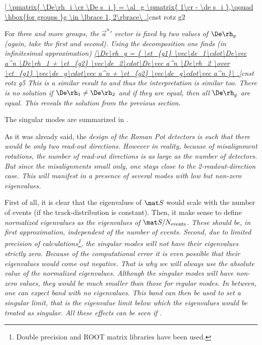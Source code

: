 \eqref{
\pmatrix{
\De\rh_i \cr
\De s_i
} = \al_g \pmatrix{
1\cr
- \de s_i
},\qquad \hbox{for groups }g \in \lbrace 1, 2\rbrace\ .}{cnst rotz g2}


For \em{three and more groups}, the ${\vec a^n}'$ vector is fixed by two values of $\De\rh_g$ (again, take the first and second). Using the decomposition  one finds (in infinitesimal approximation)
\eqref{\De\rh_g = {
\et_{g1} \vec\de_1\cdot\De\vec a^n \De\rh_1 + \et_{g2} \vec\de_2\cdot\De\vec a^n \De\rh_2
\over
\et_{g1} \vec\de_g\cdot\vec a^n + \et_{g2} \vec\de_g\cdot\vec a^n
}\ .}{cnst rotz g5}
This is a similar result to  and thus the interpretation is similar too. There is no solution if $\De\rh_1 \neq \De\rh_2$ and if they are equal, then all $\De\rh_g$ are equal. This reveals the solution  from the previous section.

The singular modes are summarized in .

As it was already said, the \em{design} of the Roman Pot detectors is such that there would be only two read-out directions. However in \em{reality}, because of misalignment rotations, the number of read-out directions is as large as the number of detectors. But since the misalignments small only, one stays close to the 2-readout-direction case. This will manifest in a presence of several modes with low but non-zero eigenvalues. 

 First of all, it is clear that the eigenvalues of $\mat S$ would scale with the number of events (if the track-distribution is constant). Then, it make sense to define \em{normalized eigenvalues} as the eigenvalues of $\mat S/N_{\rm events}$. These should be, in first approximation, independent of the number of events. Second, due to limited precision of calculations\footnote{Double precision and ROOT matrix libraries have been used.}, the singular modes will not have their eigenvalues strictly zero. Because of the computational error it is even possible that their eigenvalues would come out negative. That is why we will always use the absolute value of the normalized eigenvalues. Although the singular modes will have non-zero values, they would be much smaller than those for regular modes. In between, one can expect band with no eigenvalues. This band can then be used to set a \em{singular limit}, that is the eigenvalue limit below which the eigenvalues would be treated as singular. All these effects can be seen if .

